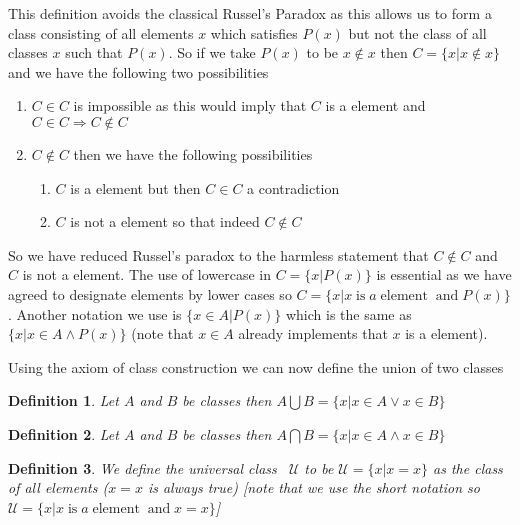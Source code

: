 \documentclass{book}
\newcommand{\nin}{\not\in}
\newcommand{\nobracket}{}
\newcommand{\tmop}[1]{\ensuremath{\operatorname{#1}}}
\newtheorem{definition}{Definition}
{\theorembodyfont{\rmfamily}\newtheorem{example}{Example}}
\begin{document}
{{\begin{note}
  This definition avoids the classical Russel's Paradox as this allows us to
  form a class consisting of all elements $x$ which satisfies $P (x)$ but not
  the class of all classes $x$ such that $P (x)$. So if we take $P (x)$ to be
  $x \nin x$ then $C = \{ x | x \nin x \nobracket \}$ and we have the
  following two possibilities
  \begin{enumerate}
    \item $C \in C$ is impossible as this would imply that $C$ is a element
    and $C \in C \Rightarrow C \nin C$
    
    \item $C \nin C$ then we have the following possibilities
    \begin{enumerate}
      \item $C$ is a element but then $C \in C$ a contradiction
      
      \item $C$ is not a element so that indeed $C \nin C$
    \end{enumerate}
  \end{enumerate}
  So we have reduced Russel's paradox to the harmless statement that $C \nin
  C$ and $C$ is not a element. The use of lowercase in $C = \{ x | \nobracket
  P (x) \}$ is essential as we have agreed to designate elements by lower
  cases so $C = \{ x | x \tmop{is} a \tmop{element} \tmop{and} P (x)
  \nobracket \}$. Another notation we use is $\{ x \in A | P (x) \nobracket
  \}$ which is the same as $\{ x | x \in A \wedge P (x) \nobracket \}$ (note
  that $x \in A$ already implements that $x$ is a element).
\end{note}

Using the axiom of class construction we can now define the union of two
classes

\begin{definition}
  {\index{$\bigcup$}}Let $A$ and $B$ be classes then $A \bigcup B = \{ x | x
  \in A \vee x \in B \nobracket \}$
\end{definition}

\begin{definition}
  {\index{$\bigcap$}}Let $A$ and $B$ be classes then $A \bigcap B = \{ x | x
  \in A \wedge x \in B \nobracket \}$
\end{definition}

\begin{definition}
  {}We define the universal class \ $\mathcal{U}$ to be
  $\mathcal{U}= \{ x | x = x \nobracket \}$ as the class of all elements ($x =
  x$ is always true) [note that we use the short notation so $\mathcal{U}= \{
  x|x \tmop{is} a \tmop{element} \tmop{and} x = x \}$]
\end{definition}

}}
\end{document}
